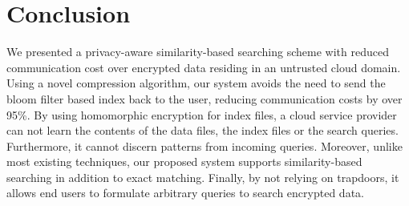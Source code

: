 

\section{Conclusion}
\label{sec:conclusion}

We presented a privacy-aware similarity-based searching scheme
with reduced communication cost over encrypted data residing in an untrusted
cloud domain. Using a novel compression 
algorithm, our system avoids the need to send the bloom filter based index back to the 
user, reducing communication costs by over 95\%.
By using homomorphic encryption for index files, a cloud service provider can not 
learn the contents of 
the data files, the index files or the search queries. Furthermore, it cannot 
discern patterns from incoming queries. Moreover, unlike most existing techniques, our
proposed system supports similarity-based searching in addition to exact matching.
Finally, by not relying on trapdoors, it allows end users to formulate
arbitrary queries to search encrypted data.

